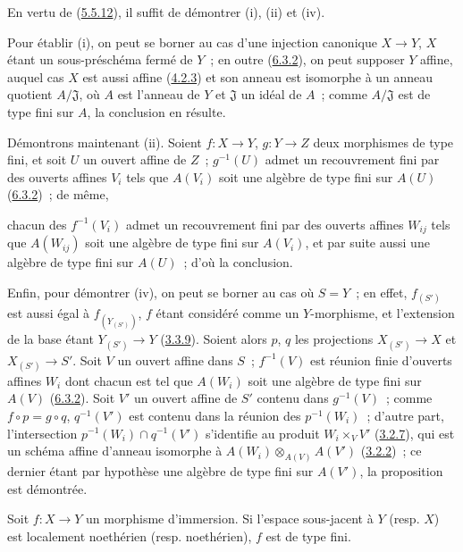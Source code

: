 En vertu de (\hyperref[I.5.5.12-fr]{5.5.12}), il suffit de démontrer (i),
(ii) et (iv).

Pour établir (i), on peut se borner au cas d'une injection canonique
$X\to Y$, $X$ étant un sous-préschéma fermé de $Y$~; en outre
(\hyperref[I.6.3.2-fr]{6.3.2}), on peut supposer $Y$ affine, auquel cas $X$
est aussi affine (\hyperref[I.4.2.3-fr]{4.2.3}) et son anneau est isomorphe à
un anneau quotient $A/\mathfrak{J}$, où $A$ est l'anneau de $Y$ et
$\mathfrak{J}$ un idéal de $A$~; comme $A/\mathfrak{J}$ est de type fini sur
$A$, la conclusion en résulte.

Démontrons maintenant (ii). Soient $f:X\to Y$, $g:Y\to Z$ deux morphismes de
type fini, et soit $U$ un ouvert affine de $Z$~; $g^{-1}(U)$ admet un
recouvrement fini par des ouverts affines $V_i$ tels que $A(V_i)$ soit une
algèbre de type fini sur $A(U)$ (\hyperref[I.6.3.2-fr]{6.3.2})~; de même,

chacun des $f^{-1}(V_i)$ admet un recouvrement fini par des ouverts affines
$W_{ij}$ tels que $A(W_{ij})$ soit une algèbre de type fini sur $A(V_i)$, et
par suite aussi une algèbre de type fini sur $A(U)$~; d'où la conclusion.

Enfin, pour démontrer (iv), on peut se borner au cas où $S=Y$~; en effet,
$f_{(S')}$ est aussi égal à $f_{(Y_{(S')})}$, $f$ étant considéré comme un
$Y$-morphisme, et l'extension de la base étant $Y_{(S')}\to Y$
(\hyperref[I.3.3.9-fr]{3.3.9}). Soient alors $p$, $q$ les projections
$X_{(S')}\to X$ et $X_{(S')}\to S'$. Soit $V$ un ouvert affine dans $S$~;
$f^{-1}(V)$ est réunion finie d'ouverts affines $W_i$ dont chacun est tel que
$A(W_i)$ soit une algèbre de type fini sur $A(V)$
(\hyperref[I.6.3.2-fr]{6.3.2}). Soit $V'$ un ouvert affine de $S'$ contenu
dans $g^{-1}(V)$~; comme $f\circ p=g\circ q$, $q^{-1}(V')$ est contenu dans la
réunion des $p^{-1}(W_i)$~; d'autre part, l'intersection
$p^{-1}(W_i)\cap q^{-1}(V')$ s'identifie au produit $W_i\times_V V'$
(\hyperref[I.3.2.7-fr]{3.2.7}), qui est un schéma affine d'anneau isomorphe à
$A(W_i)\otimes_{A(V)}A(V')$ (\hyperref[I.3.2.2-fr]{3.2.2})~; ce dernier étant
par hypothèse une algèbre de type fini sur $A(V')$, la proposition est
démontrée.

\begin{corollary}[6.3.5]
\label{I.6.3.5-fr}
Soit $f:X\to Y$ un morphisme d'immersion. Si l'espace sous-jacent à $Y$
\textup{(resp. $X$)} est localement noethérien \textup{(resp.} noethérien), $f$ est de type fini.
\end{corollary}

